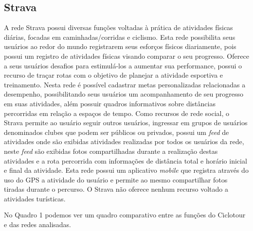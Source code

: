 \subsection{Strava}
A rede Strava \cite{strava} possui diversas funções voltadas à prática de atividades físicas diárias, focadas em caminhadas/corridas e ciclismo. Esta
rede possibilita seus usuários ao redor do mundo registrarem seus esforços físicos diariamente, pois possui um registro de atividades físicas visando 
comparar o seu progresso. Oferece a seus usuários desafios para estimulá-los a aumentar sua performance, possui o recurso de traçar rotas com o 
objetivo de planejar a atividade esportiva e treinamento. Nesta rede é possível cadastrar metas personalizadas relacionadas a desempenho, 
possibilitando seus usuários um acompanhamento de seu progresso em suas atividades, além possuir quadros informativos sobre distâncias percorridas 
em relação a espaços de tempo. Como recursos de rede social, o Strava permite ao usuário seguir outros usuários, ingressar em grupos de usuários 
denominados clubes que podem ser públicos ou privados, possui um \textit{feed} de atividades onde são exibidas atividades realizadas por todos os 
usuários da rede, neste \textit{feed} são exibidas fotos compartilhadas durante a realização destas atividades e a rota percorrida com informações 
de distância total e horário inicial e final da atividade. Esta rede possui um aplicativo \textit{mobile} que registra através do uso do GPS a 
atividade do usuário e permite ao mesmo compartilhar fotos tiradas durante o percurso. O Strava não oferece nenhum recurso voltado a atividades 
turísticas.

No Quadro 1 podemos ver um quadro comparativo entre as funções do Ciclotour e das redes analisadas.

